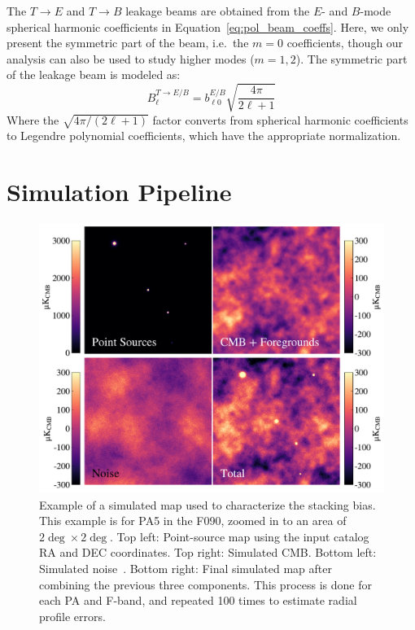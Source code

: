 The $T\rightarrow E$ and $T\rightarrow B$ leakage beams are obtained from the $E$- and $B$-mode spherical harmonic coefficients in Equation~\ref{eq:pol_beam_coeffs}.  Here, we only present the symmetric part of the beam, i.e.\ the $m=0$ coefficients, though our analysis can also be used to study higher modes ($m=1,2$).  
The symmetric part of the leakage beam is modeled as:
\begin{equation}
B^{T\rightarrow E/B}_{\ell} = b^{E/B}_{\ell 0} \sqrt{\frac{4 \pi}{2 \ell + 1}}
\end{equation}
Where the $\sqrt{4 \pi / (2 \ell + 1)}$ factor converts from spherical harmonic coefficients to Legendre polynomial coefficients, which have the appropriate normalization. 
\section{Simulation Pipeline}
\label{sec:sim_pipe}

\begin{figure}[t!]
    \centering
    \includegraphics[width=\linewidth]{Figures/simmap.pdf}
    \caption{Example of a simulated map used to characterize the stacking bias.  This example is for PA5 in the F090, zoomed in to an area of $2\deg\times2\deg$.  Top left: Point-source map using the input catalog RA and DEC coordinates.  Top right:  Simulated CMB.  Bottom left:  Simulated noise~\cite{atkins}.  Bottom right: Final simulated map after combining the previous three components.  This process is done for each PA and F-band, and repeated 100 times to estimate radial profile errors.
    }
    \label{fig:sim_map}
\end{figure}

